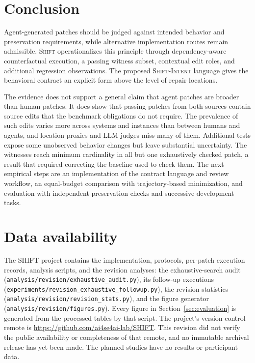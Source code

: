 \documentclass[a4paper,fleqn]{cas-sc}
\newcommand{\tool}{\textsc{Shift}}
\newcommand{\dsl}{\textsc{Shift-Intent}}
\begin{document}
\section{Conclusion}\label{sec:conclusion}

Agent-generated patches should be judged against intended behavior and preservation requirements, while alternative implementation routes remain admissible. \tool{} operationalizes this principle through dependency-aware counterfactual execution, a passing witness subset, contextual edit roles, and additional regression observations. The proposed \dsl{} language gives the behavioral contract an explicit form above the level of repair locations.

The evidence does not support a general claim that agent patches are broader than human patches. It does show that passing patches from both sources contain source edits that the benchmark obligations do not require. The prevalence of such edits varies more across systems and instances than between humans and agents, and location proxies and LLM judges miss many of them. Additional tests expose some unobserved behavior changes but leave substantial uncertainty. The witnesses reach minimum cardinality in all but one exhaustively checked patch, a result that required correcting the baseline used to check them. The next empirical steps are an implementation of the contract language and review workflow, an equal-budget comparison with trajectory-based minimization, and evaluation with independent preservation checks and successive development tasks.

\section*{Data availability}
The SHIFT project contains the implementation, protocols, per-patch execution records, analysis scripts, and the revision analyses: the exhaustive-search audit (\nolinkurl{analysis/revision/exhaustive_audit.py}), its follow-up executions (\nolinkurl{experiments/revision_exhaustive_followup.py}), the revision statistics (\nolinkurl{analysis/revision/revision_stats.py}), and the figure generator (\nolinkurl{analysis/revision/figures.py}). Every figure in Section~\ref{sec:evaluation} is generated from the processed tables by that script. The project's version-control remote is \url{https://github.com/ai4se4ai-lab/SHIFT}. This revision did not verify the public availability or completeness of that remote, and no immutable archival release has yet been made. The planned studies have no results or participant data.
\end{document}
